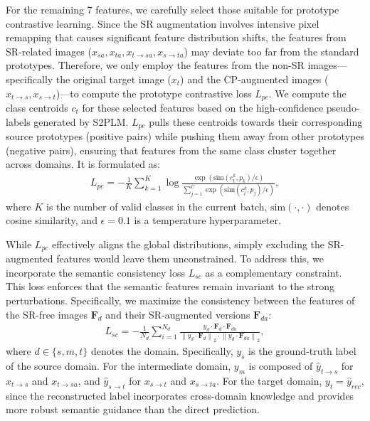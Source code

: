 For the remaining 7 features, we carefully select those suitable for prototype contrastive learning. Since the SR augmentation involves intensive pixel remapping that causes significant feature distribution shifts, the features from SR-related images ($x_{sa}, x_{ta}, x_{t \to sa}, x_{s \to ta}$) may deviate too far from the standard prototypes. Therefore, we only employ the features from the non-SR images—specifically the original target image ($x_t$) and the CP-augmented images ($x_{t \to s}, x_{s \to t}$)—to compute the prototype contrastive loss $L_{pc}$.
We compute the class centroids $c_t$ for these selected features based on the high-confidence pseudo-labels generated by S2PLM. $L_{pc}$ pulls these centroids towards their corresponding source prototypes (positive pairs) while pushing them away from other prototypes (negative pairs), ensuring that features from the same class cluster together across domains. It is formulated as:
\begin{align} \label{eq_pc}
  L_{pc} = - \frac{1}{K} \sum_{k=1}^{K} \log \frac{\exp(\text{sim}(c_t^k, p_k)/\epsilon)}{\sum_{j=1}^{C} \exp(\text{sim}(c_t^k, p_j)/\epsilon)},
\end{align}
where $K$ is the number of valid classes in the current batch, $\text{sim}(\cdot, \cdot)$ denotes cosine similarity, and $\epsilon=0.1$ is a temperature hyperparameter.

While $L_{pc}$ effectively aligns the global distributions, simply excluding the SR-augmented features would leave them unconstrained. To address this, we incorporate the semantic consistency loss $L_{sc}$ as a complementary constraint. This loss enforces that the semantic features remain invariant to the strong perturbations. Specifically, we maximize the consistency between the features of the SR-free images $\boldsymbol{F}_{d}$ and their SR-augmented versions $\boldsymbol{F}_{da}$:
\begin{align} \label{eq_sc}
  L_{sc} = - \frac{1}{N_{d}} \sum_{i=1}^{N_{d}} 
  \frac{y_{d}\cdot \boldsymbol{F}_{d} \cdot \boldsymbol{F}_{da}}
  {\left \| y_{d} \cdot \boldsymbol{F}_{d}  \right \|_{2} \cdot \left \| y_{d} \cdot \boldsymbol{F}_{da}  \right \|_{2}},
\end{align}
where $d \in \{s, m, t\}$ denotes the domain. Specifically, $y_s$ is the ground-truth label of the source domain. For the intermediate domain, $y_m$ is composed of $\hat{y}_{t\to s}$ for $x_{t\to s}$ and $x_{t\to sa}$, and $\hat{y}_{s\to t}$ for $x_{s\to t}$ and $x_{s\to ta}$. For the target domain, $y_t = \hat{y}_{rec}$, since the reconstructed label incorporates cross-domain knowledge and provides more robust semantic guidance than the direct prediction.

